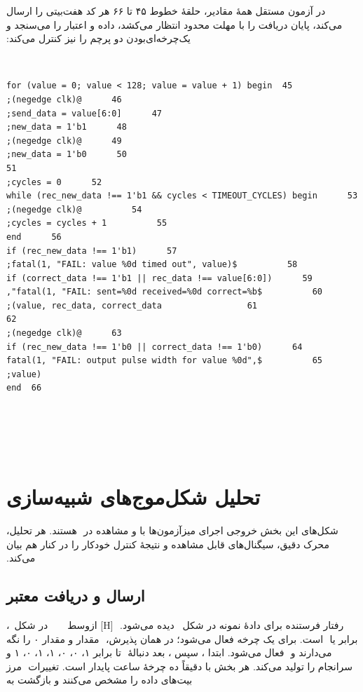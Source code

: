 ‫
‫در آزمون مستقل همهٔ مقادیر، حلقهٔ خطوط ۴۵ تا ۶۶ هر کد هفت‌بیتی را ارسال می‌کند، پایان
‫دریافت را با مهلت محدود انتظار می‌کشد، داده و اعتبار را می‌سنجد و یک‌چرخه‌ای‌بودن دو پرچم
‫را نیز کنترل می‌کند:
‫
‫\begin{dsdlcodeblock}
‫\begin{verbatim}
‫45  for (value = 0; value < 128; value = value + 1) begin
‫46      @(negedge clk);
‫47      send_data = value[6:0];
‫48      new_data = 1'b1;
‫49      @(negedge clk);
‫50      new_data = 1'b0;
‫51
‫52      cycles = 0;
‫53      while (rec_new_data !== 1'b1 && cycles < TIMEOUT_CYCLES) begin
‫54          @(negedge clk);
‫55          cycles = cycles + 1;
‫56      end
‫57      if (rec_new_data !== 1'b1)
‫58          $fatal(1, "FAIL: value %0d timed out", value);
‫59      if (correct_data !== 1'b1 || rec_data !== value[6:0])
‫60          $fatal(1, "FAIL: sent=%0d received=%0d correct=%b",
‫61                 value, rec_data, correct_data);
‫62
‫63      @(negedge clk);
‫64      if (rec_new_data !== 1'b0 || correct_data !== 1'b0)
‫65          $fatal(1, "FAIL: output pulse width for value %0d", value);
‫66  end
‫\end{verbatim}
‫\end{dsdlcodeblock}
‫
‫
‫\section{تحلیل شکل‌موج‌های شبیه‌سازی}
‫
‫شکل‌های این بخش خروجی اجرای میزآزمون‌ها با  و مشاهده در
‫ هستند. هر تحلیل، محرک دقیق، سیگنال‌های قابل مشاهده و نتیجهٔ کنترل خودکار را
‫در کنار هم بیان می‌کند.
‫
‫
‫\subsection{ارسال و دریافت معتبر}
‫
‫رفتار فرستنده برای دادهٔ نمونه در شکل~ دیده می‌شود.
‫
‫[H]
‫‌ازوسط
‫
‫
‫
‫
‫
‫در شکل~،  برابر  یا
‫ است.  برای یک چرخه فعال می‌شود؛ در همان پذیرش،
‫ مقدار  و  مقدار ۰ را نگه می‌دارند و
‫ فعال می‌شود.  ابتدا ، سپس ، بعد دنبالهٔ
‫ تا  برابر ۱، ۰، ۰، ۱، ۱، ۰، ۱ و سرانجام  را تولید
‫می‌کند. هر بخش با  دقیقاً ده چرخهٔ ساعت پایدار است. تغییرات
‫ مرز بیت‌های داده را مشخص می‌کنند و بازگشت  به 
